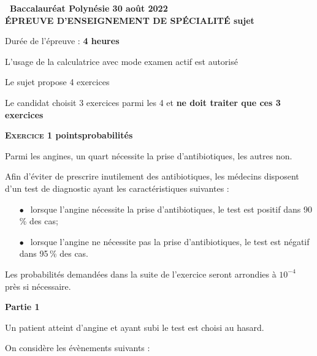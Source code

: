 \documentclass[11pt]{article}
\begin{document}
\setlength\parindent{0mm}
\pagestyle{fancy}
\thispagestyle{empty}

\begin{center}{\Large\textbf{\decofourleft~Baccalauréat Polynésie 30 août 2022~\decofourright\\[6pt] ÉPREUVE D'ENSEIGNEMENT DE SPÉCIALITÉ sujet }}

\bigskip

Durée de l'épreuve : \textbf{4 heures}

\medskip

L'usage de la calculatrice avec mode examen actif est autorisé

\medskip

Le sujet propose 4 exercices

Le candidat choisit 3 exercices parmi les 4 et \textbf{ne doit traiter que ces 3 exercices}
\end{center}

\bigskip

\textbf{\textsc{Exercice 1}  points\hfill probabilités}

\medskip

Parmi les angines, un quart nécessite la prise d'antibiotiques, les autres non.

Afin d'éviter de prescrire inutilement des antibiotiques, les médecins disposent d'un test de diagnostic ayant les caractéristiques suivantes :

\begin{itemize}
\item[$\bullet~~$]lorsque l'angine nécessite la prise d'antibiotiques, le test est positif dans 90\,\% des cas;
\item[$\bullet~~$]lorsque l'angine ne nécessite pas la prise d'antibiotiques, le test est négatif dans 95\,\% des cas.
\end{itemize}

\medskip

Les probabilités demandées dans la suite de l'exercice seront arrondies à $10^{-4}$ près si nécessaire.

\bigskip

\textbf{Partie 1}

\medskip

Un patient atteint d'angine et ayant subi le test est choisi au hasard. 

On considère les évènements suivants :
\end{document}
